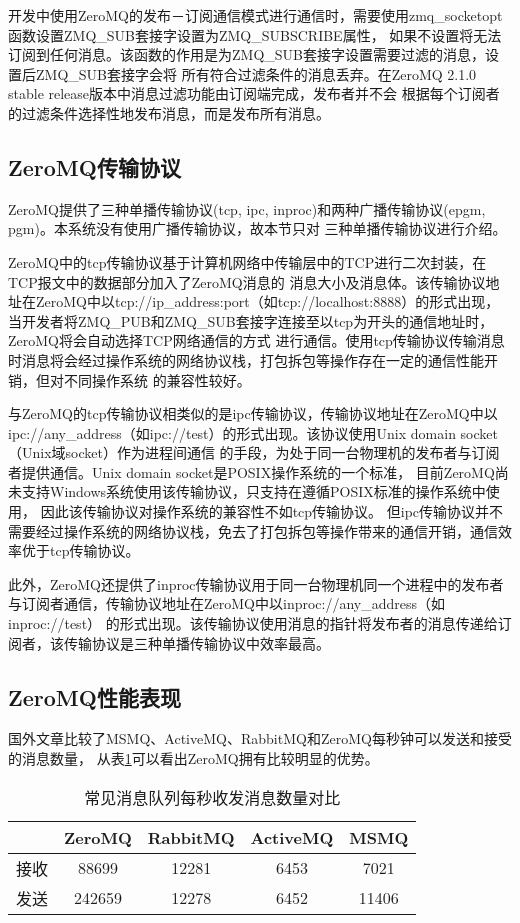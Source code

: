 开发中使用ZeroMQ的发布－订阅通信模式进行通信时，需要使用zmq\_socketopt函数设置ZMQ\_SUB套接字设置为ZMQ\_SUBSCRIBE属性，
如果不设置将无法订阅到任何消息。该函数的作用是为ZMQ\_SUB套接字设置需要过滤的消息，设置后ZMQ\_SUB套接字会将
所有符合过滤条件的消息丢弃。在ZeroMQ 2.1.0 stable release版本中消息过滤功能由订阅端完成，发布者并不会
根据每个订阅者的过滤条件选择性地发布消息，而是发布所有消息。

\subsection{ZeroMQ传输协议}
ZeroMQ提供了三种单播传输协议(tcp, ipc, inproc)和两种广播传输协议(epgm, pgm)。本系统没有使用广播传输协议，故本节只对
三种单播传输协议进行介绍。

ZeroMQ中的tcp传输协议基于计算机网络中传输层中的TCP进行二次封装，在TCP报文中的数据部分加入了ZeroMQ消息的
消息大小及消息体。该传输协议地址在ZeroMQ中以tcp://ip\_address:port（如tcp://localhost:8888）的形式出现，
当开发者将ZMQ\_PUB和ZMQ\_SUB套接字连接至以tcp为开头的通信地址时，ZeroMQ将会自动选择TCP网络通信的方式
进行通信。使用tcp传输协议传输消息时消息将会经过操作系统的网络协议栈，打包拆包等操作存在一定的通信性能开销，但对不同操作系统
的兼容性较好。

与ZeroMQ的tcp传输协议相类似的是ipc传输协议，传输协议地址在ZeroMQ中以ipc://any\_address（如ipc://test）的形式出现。该协议使用Unix domain socket（Unix域socket）作为进程间通信
的手段，为处于同一台物理机的发布者与订阅者提供通信。Unix domain socket是POSIX操作系统的一个标准，
目前ZeroMQ尚未支持Windows系统使用该传输协议，只支持在遵循POSIX标准的操作系统中使用，
因此该传输协议对操作系统的兼容性不如tcp传输协议。
但ipc传输协议并不需要经过操作系统的网络协议栈，免去了打包拆包等操作带来的通信开销，通信效率优于tcp传输协议。

此外，ZeroMQ还提供了inproc传输协议用于同一台物理机同一个进程中的发布者与订阅者通信，传输协议地址在ZeroMQ中以inproc://any\_address（如inproc://test）
的形式出现。该传输协议使用消息的指针将发布者的消息传递给订阅者，该传输协议是三种单播传输协议中效率最高。

\subsection{ZeroMQ性能表现}
国外文章\cite{mqcompare}比较了MSMQ、ActiveMQ、RabbitMQ和ZeroMQ每秒钟可以发送和接受的消息数量，
从表\ref{messge_queue_compare}可以看出ZeroMQ拥有比较明显的优势。
\begin{table}[htb]
  \centering\small
  \caption{常见消息队列每秒收发消息数量对比\cite{mqcompare}}
  \label{messge_queue_compare}
  \begin{tabular}{ccccc}
    \toprule
    & ZeroMQ & RabbitMQ & ActiveMQ & MSMQ \\
    \midrule
    接收 & 88699 & 12281 & 6453 & 7021 \\
    发送 & 242659 & 12278 & 6452 & 11406 \\
    \bottomrule
  \end{tabular}
\end{table}

